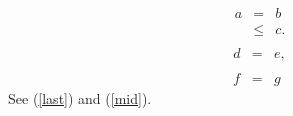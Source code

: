 \documentclass{article}
\begin{document}
\begin{eqnarray}
a &=& b \nonumber\\
  &\leq& c .\nonumber\\
\label{last}
\end{eqnarray}
\begin{eqnarray}
d &=& e ,\nonumber\\
\label{mid}\\
f &=& g \nonumber
\end{eqnarray}
See (\ref{last}) and (\ref{mid}).
\end{document}
